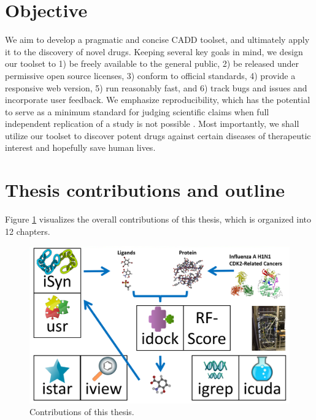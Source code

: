 \section{Objective}

We aim to develop a pragmatic and concise CADD toolset, and ultimately apply it to the discovery of novel drugs. Keeping several key goals in mind, we design our toolset to 1) be freely available to the general public, 2) be released under permissive open source licenses, 3) conform to official standards, 4) provide a responsive web version, 5) run reasonably fast, and 6) track bugs and issues and incorporate user feedback. We emphasize reproducibility, which has the potential to serve as a minimum standard for judging scientific claims when full independent replication of a study is not possible \citep{965}. Most importantly, we shall utilize our toolset to discover potent drugs against certain diseases of therapeutic interest and hopefully save human lives.

\section{Thesis contributions and outline}

Figure \ref{thesis:contributions} visualizes the overall contributions of this thesis, which is organized into 12 chapters.

\begin{figure}
\begin{center}
\includegraphics[width=\linewidth]{Contributions.png}
\end{center}
\caption{Contributions of this thesis.}
\label{thesis:contributions}
\end{figure}

